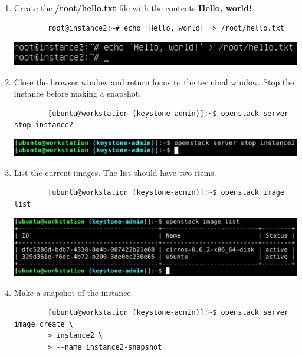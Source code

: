 \documentclass[letterpaper, 12pt]{article}
\begin{document}
\begin{enumerate}
    \item Create the \textbf{/root/hello.txt} file with the contents \textbf{Hello, world!}.
    \begin{lstlisting}
        root@instance2:~# echo 'Hello, world!' > /root/hello.txt
    \end{lstlisting}

    \begin{center}
        \includegraphics[width=\linewidth]{images/part2/step7.png}
    \end{center}

    \item Close the browser window and return focus to the terminal window. Stop the instance before making a snapshot.
    \begin{lstlisting}
        [ubuntu@workstation (keystone-admin)]:~$ openstack server stop instance2
    \end{lstlisting}

    \begin{center}
        \includegraphics[width=\linewidth]{images/part2/step8.png}
    \end{center}

    \item List the current images. The list should have two items.
    \begin{lstlisting}
        [ubuntu@workstation (keystone-admin)]:~$ openstack image list
    \end{lstlisting}

    \begin{center}
        \includegraphics[width=\linewidth]{images/part2/step9.png}
    \end{center}

    \item Make a snapshot of the instance.
    \begin{lstlisting}
        [ubuntu@workstation (keystone-admin)]:~$ openstack server image create \
        > instance2 \
        > --name instance2-snapshot
    \end{lstlisting}


\end{enumerate}
\end{document}
